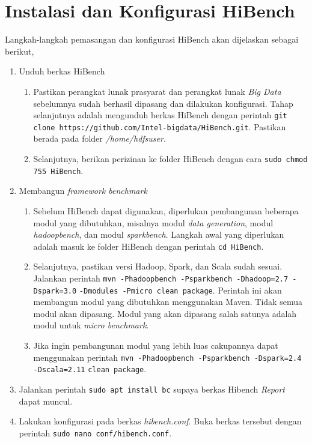 \chapter{Instalasi dan Konfigurasi HiBench}
\label{appendix:E}

Langkah-langkah pemasangan dan konfigurasi HiBench akan dijelaskan sebagai berikut,

\begin{enumerate}
  \item Unduh berkas HiBench
  \begin{enumerate}
    \item Pastikan perangkat lunak prasyarat dan perangkat lunak \textit{Big Data} sebelumnya sudah berhasil dipasang dan dilakukan konfigurasi. Tahap selanjutnya adalah mengunduh berkas HiBench dengan perintah \verb|git clone https://github.com/Intel-bigdata/HiBench.git|. Pastikan berada pada folder \textit{/home/hdfsuser}.
    \item Selanjutnya, berikan perizinan ke folder HiBench dengan cara \verb|sudo chmod 755 HiBench|.
  \end{enumerate}
  \item Membangun \textit{framework benchmark}
  \begin{enumerate}
    \item Sebelum HiBench dapat digunakan, diperlukan pembangunan beberapa modul yang dibutuhkan, misalnya modul \textit{data generation}, modul \textit{hadoopbench}, dan modul \textit{sparkbench}. Langkah awal yang diperlukan adalah masuk ke folder HiBench dengan perintah \verb|cd HiBench|.
    \item Selanjutnya, pastikan versi Hadoop, Spark, dan Scala sudah sesuai. Jalankan perintah \verb|mvn -Phadoopbench -Psparkbench -Dhadoop=2.7 -Dspark=3.0| \newline \verb|-Dmodules -Pmicro clean package|. Perintah ini akan membangun modul yang dibutuhkan menggunakan Maven. Tidak semua modul akan dipasang. Modul yang akan dipasang salah satunya adalah modul untuk \textit{micro benchmark}. 
    \item Jika ingin pembangunan modul yang lebih luas cakupannya dapat menggunakan perintah \verb|mvn -Phadoopbench -Psparkbench -Dspark=2.4 -Dscala=2.11| \newline \verb|clean package|.
  \end{enumerate}
  \item Jalankan perintah \verb |sudo apt install bc| supaya berkas Hibench \textit{Report} dapat muncul. 
  \item Lakukan konfigurasi pada berkas \textit{hibench.conf}. Buka berkas tersebut dengan perintah \verb|sudo nano conf/hibench.conf|.

\end{enumerate}
